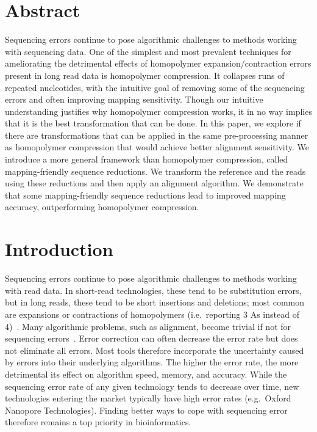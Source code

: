 \documentclass[
  11pt,
  twoside]{scrbook}
\begin{document}
\hypertarget{hpc-abstract}{%
\section*{Abstract}\label{hpc-abstract}}

Sequencing errors continue to pose algorithmic challenges to methods working with sequencing data. One of the simplest and most prevalent techniques for ameliorating the detrimental effects of homopolymer expansion/contraction errors present in long read data is homopolymer compression. It collapses runs of repeated nucleotides, with the intuitive goal of removing some of the sequencing errors and often improving mapping sensitivity. Though our intuitive understanding justifies why homopolymer compression works, it in no way implies that it is the best transformation that can be done. In this paper, we explore if there are transformations that can be applied in the same pre-processing manner as homopolymer compression that would achieve better alignment sensitivity. We introduce a more general framework than homopolymer compression, called mapping-friendly sequence reductions. We transform the reference and the reads using these reductions and then apply an alignment algorithm. We demonstrate that some mapping-friendly sequence reductions lead to improved mapping accuracy, outperforming homopolymer compression.

\hypertarget{hpc-introduction}{%
\section{Introduction}\label{hpc-introduction}}

Sequencing errors continue to pose algorithmic challenges to methods working with read data. In short-read technologies, these tend to be substitution errors, but in long reads, these tend to be short insertions and deletions; most common are expansions or contractions of homopolymers (i.e.~reporting 3 As instead of 4)~\autocite{dohmBenchmarkingLongreadCorrection2020}. Many algorithmic problems, such as alignment, become trivial if not for sequencing errors~\autocite{gusfieldAlgorithmsStringsTrees1997}. Error correction can often decrease the error rate but does not eliminate all errors. Most tools therefore incorporate the uncertainty caused by errors into their underlying algorithms. The higher the error rate, the more detrimental its effect on algorithm speed, memory, and accuracy. While the sequencing error rate of any given technology tends to decrease over time, new technologies entering the market typically have high error rates (e.g.~Oxford Nanopore Technologies). Finding better ways to cope with sequencing error therefore remains a top priority in bioinformatics.
\end{document}
